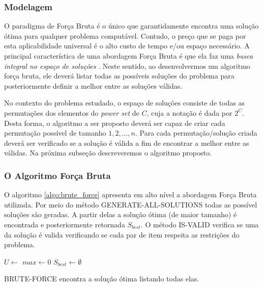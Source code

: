 \documentclass[12pt]{article}
\begin{document}
\subsubsection{Modelagem}
\label{subsubsec:model_fb}
O paradigma de Força Bruta é o único que garantidamente encontra uma solução ótima para qualquer problema computável. Contudo, o preço que se paga por esta aplicabilidade universal é o alto custo de tempo e/ou espaço necessário. A principal característica de uma abordagem Força Bruta é que ela faz uma \textit{busca integral no espaço de soluções} \cite{Kleinberg:2005:AD:1051910}{}. Neste sentido, ao desenvolvermos um algoritmo força bruta, ele deverá listar todas as possíveis soluções do problema para posteriormente definir a melhor entre as soluções válidas.

No contexto do problema estudado, o espaço de soluções consiste de todas as permutações dos elementos do \textit{power set} de $C$, cuja a notação é dada por $2^{C}$. Desta forma, o algoritmo a ser proposto deverá ser capaz de criar cada permutação possível de tamanho $1,2,\ldots, n$. Para cada permutação/solução criada deverá ser verificado se a solução é válida a fim de encontrar a melhor entre as válidas. Na próxima subseção descreveremos o algoritmo proposto.

\subsubsection{O Algoritmo Força Bruta}
\label{subsubsec:alg_fb}

O algoritmo \ref{algo:brute_force} apresenta em alto nível a abordagem Força Bruta utilizada. Por meio do método \textsc{GENERATE-ALL-SOLUTIONS} todas as possível soluções são geradas. A partir delas a solução ótima (de maior tamanho) é encontrada e posteriormente retornada $S_{best}$. O método \textsc{IS-VALID} verifica se uma da solução é valida verificando se cada par de item respeita as restrições do problema.

\begin{algorithm}
\DontPrintSemicolon %

$U \gets $ \;
$max \gets 0$\;
$S_{best} \gets \emptyset$\;
 {
}
\;
\caption{{\sc BRUTE-FORCE} encontra a solução ótima listando todas elas.}
\label{algo:brute_force}
\end{algorithm}
\end{document}
